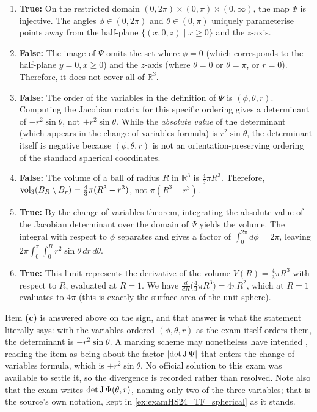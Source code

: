 \begin{exercisesolution}
\label{sol:spherical_coordinates_integral_tf}
\begin{enumerate}[label=\textbf{(\alph*)}]
  \item \textbf{True:} On the restricted domain $(0, 2\pi) \times (0, \pi) \times (0, \infty)$, the map $\Psi$ is injective. The angles $\phi \in (0, 2\pi)$ and $\theta \in (0, \pi)$ uniquely parameterise points away from the half-plane $\{(x,0,z) \mid x \ge 0\}$ and the $z$-axis.
  \item \textbf{False:} The image of $\Psi$ omits the set where $\phi = 0$ (which corresponds to the half-plane $y = 0, x \ge 0$) and the $z$-axis (where $\theta = 0$ or $\theta = \pi$, or $r=0$). Therefore, it does not cover all of $\mathbb{R}^3$.
  \item \textbf{False:} The order of the variables in the definition of $\Psi$ is $(\phi, \theta, r)$. Computing the Jacobian matrix for this specific ordering gives a determinant of $-r^2 \sin \theta$, not $+r^2 \sin \theta$. While the \emph{absolute value} of the determinant (which appears in the change of variables formula) is $r^2 \sin \theta$, the determinant itself is negative because $(\phi, \theta, r)$ is not an orientation-preserving ordering of the standard spherical coordinates.
  \item \textbf{False:} The volume of a ball of radius $R$ in $\mathbb{R}^3$ is $\frac{4}{3}\pi R^3$. Therefore, $\operatorname{vol}_3(B_R \setminus B_r) = \frac{4}{3}\pi(R^3 - r^3)$, not $\pi(R^3 - r^3)$.
  \item \textbf{True:} By the change of variables theorem, integrating the absolute value of the Jacobian determinant over the domain of $\Psi$ yields the volume. The integral with respect to $\phi$ separates and gives a factor of $\int_0^{2\pi} d\phi = 2\pi$, leaving $2\pi \int_0^\pi \int_0^R r^2 \sin \theta \, dr \, d\theta$.
  \item \textbf{True:} This limit represents the derivative of the volume $V(R) = \frac{4}{3}\pi R^3$ with respect to $R$, evaluated at $R=1$. We have $\frac{d}{dR} \big(\frac{4}{3}\pi R^3\big) = 4\pi R^2$, which at $R=1$ evaluates to $4\pi$ (this is exactly the surface area of the unit sphere).
\end{enumerate}
\begin{ainote}
Item \textbf{(c)} is answered  above on the sign, and that answer is what the statement
literally says: with the variables ordered $(\phi,\theta,r)$ as the exam itself orders them, the
determinant is $-r^2\sin\theta$. A marking scheme may nonetheless have intended , reading
the item as being about the factor $\lvert\det\operatorname{J}\Psi\rvert$ that enters the change of variables
formula, which is $+r^2\sin\theta$. No official solution to this exam was available to settle it,
so the divergence is recorded rather than resolved. Note also that the exam writes
$\det \operatorname{J}\Psi(\theta,r)$, naming only two of the three variables; that is the source's own
notation, kept in \cref{ex:examHS24_TF_spherical} as it stands.
\end{ainote}
\end{exercisesolution}

